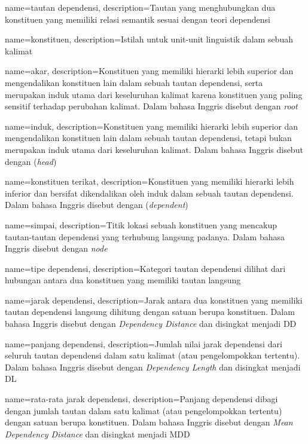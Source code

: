 {
    name=tautan dependensi,
    description={Tautan yang menghubungkan dua konstituen yang memiliki relasi semantik sesuai dengan teori dependensi}
}

{
    name=konstituen,
    description={Istilah untuk unit-unit linguistik dalam sebuah kalimat}
}

{
    name=akar,
    description={Konstituen yang memiliki hierarki lebih superior dan mengendalikan konstituen lain dalam sebuah tautan dependensi, serta merupakan induk utama dari keseluruhan kalimat karena konstituen yang paling sensitif terhadap perubahan kalimat. Dalam bahasa Inggris disebut dengan \textit{root}}
}

{
    name=induk,
    description={Konstituen yang memiliki hierarki lebih superior dan mengendalikan konstituen lain dalam sebuah tautan dependensi, tetapi bukan merupakan induk utama dari keseluruhan kalimat. Dalam bahasa Inggris disebut dengan (\textit{head})}
}

{
    name=konstituen terikat,
    description={Konstituen yang memiliki hierarki lebih inferior dan bersifat dikendalikan oleh induk dalam sebuah tautan dependensi. Dalam bahasa Inggris disebut dengan (\textit{dependent})}
}

{
    name=simpai,
    description={Titik lokasi sebuah konstituen yang mencakup tautan-tautan dependensi yang terhubung langsung padanya. Dalam bahasa Inggris disebut dengan \textit{node}}
}

{
    name=tipe dependensi,
    description={Kategori tautan dependensi dilihat dari hubungan antara dua konstituen yang memiliki tautan langsung}
}

{
    name=jarak dependensi,
    description={Jarak antara dua konstituen yang memiliki tautan dependensi langsung dihitung dengan satuan berupa konstituen. Dalam bahasa Inggris disebut dengan \textit{Dependency Distance} dan disingkat menjadi DD}
}

{
    name=panjang dependensi,
    description={Jumlah nilai jarak dependensi dari seluruh tautan dependensi dalam satu kalimat (atau pengelompokkan tertentu). Dalam bahasa Inggris disebut dengan \textit{Dependency Length} dan disingkat menjadi DL}
}

{
    name=rata-rata jarak dependensi,
    description={Panjang dependensi dibagi dengan jumlah tautan dalam satu kalimat (atau pengelompokkan tertentu) dengan satuan berupa konstituen. Dalam bahasa Inggris disebut dengan \textit{Mean Dependency Distance} dan disingkat menjadi MDD}
}

